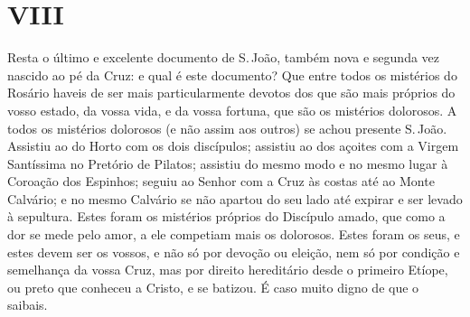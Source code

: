 \section*{VIII}

Resta o último e excelente documento de S.\,João, também
nova e segunda vez nascido ao pé da Cruz: e qual é este documento? Que
entre todos os mistérios do Rosário haveis de ser mais particularmente
devotos dos que são mais próprios do vosso estado, da vossa vida, e da
vossa fortuna, que são os mistérios dolorosos. A todos os mistérios
dolorosos (e não assim aos outros) se achou presente S.\,João. Assistiu
ao do Horto com os dois discípulos; assistiu ao dos açoites com a Virgem
Santíssima no Pretório de Pilatos; assistiu do mesmo modo e no mesmo
lugar à Coroação dos Espinhos; seguiu ao Senhor com a Cruz às costas até
ao Monte Calvário; e no mesmo Calvário se não apartou do seu lado até
expirar e ser levado à sepultura. Estes foram os mistérios próprios do
Discípulo amado, que como a dor se mede pelo amor, a ele competiam mais
os dolorosos. Estes foram os seus, e estes devem ser os vossos, e não só
por devoção ou eleição, nem só por condição e semelhança da vossa Cruz,
mas por direito hereditário desde o primeiro Etíope, ou preto que
conheceu a Cristo, e se batizou. É caso muito digno de que o saibais.

